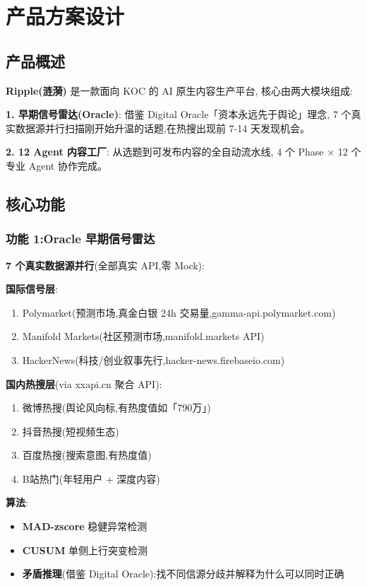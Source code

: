\section{产品方案设计}

\subsection{产品概述}

\textbf{Ripple(涟漪)} 是一款面向 KOC 的 AI 原生内容生产平台,
核心由两大模块组成:

\begin{insight}
\textbf{1. 早期信号雷达(Oracle)}: 借鉴 Digital Oracle「资本永远先于舆论」理念,
7 个真实数据源并行扫描刚开始升温的话题,在热搜出现前 7-14 天发现机会。

\textbf{2. 12 Agent 内容工厂}: 从选题到可发布内容的全自动流水线,
4 个 Phase × 12 个专业 Agent 协作完成。
\end{insight}

\subsection{核心功能}

\subsubsection{功能 1:Oracle 早期信号雷达}

\textbf{7 个真实数据源并行}(全部真实 API,零 Mock):

\textbf{国际信号层}:
\begin{enumerate}
\item Polymarket(预测市场,真金白银 24h 交易量,gamma-api.polymarket.com)
\item Manifold Markets(社区预测市场,manifold.markets API)
\item HackerNews(科技/创业叙事先行,hacker-news.firebaseio.com)
\end{enumerate}

\textbf{国内热搜层}(via xxapi.cn 聚合 API):
\begin{enumerate}[resume]
\item 微博热搜(舆论风向标,有热度值如「790万」)
\item 抖音热搜(短视频生态)
\item 百度热搜(搜索意图,有热度值)
\item B站热门(年轻用户 + 深度内容)
\end{enumerate}

\textbf{算法}:
\begin{itemize}
\item \textbf{MAD-zscore} 稳健异常检测
\item \textbf{CUSUM} 单侧上行突变检测
\item \textbf{矛盾推理}(借鉴 Digital Oracle):找不同信源分歧并解释为什么可以同时正确
\end{itemize}

